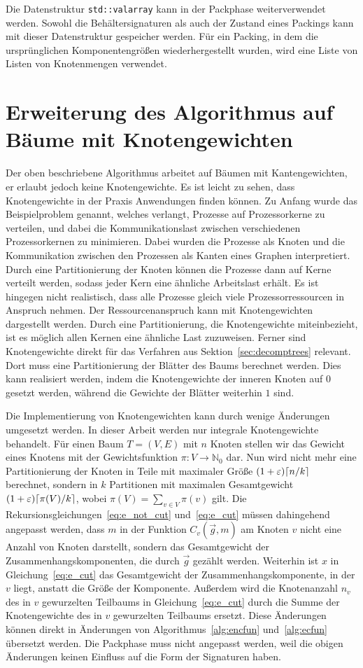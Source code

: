 Die Datenstruktur \texttt{std::valarray} kann in der Packphase weiterverwendet werden.
Sowohl die Behältersignaturen als auch der Zustand eines Packings kann mit dieser Datenstruktur gespeicher werden.
Für ein Packing, in dem die ursprünglichen Komponentengrößen wiederhergestellt wurden, wird eine Liste von Listen von Knotenmengen verwendet.

\section{Erweiterung des Algorithmus auf Bäume mit Knotengewichten}\label{sec:nodeweights}
Der oben beschriebene Algorithmus arbeitet auf Bäumen mit Kantengewichten, er erlaubt jedoch keine Knotengewichte.
Es ist leicht zu sehen, dass Knotengewichte in der Praxis Anwendungen finden können.
Zu Anfang wurde das Beispielproblem genannt, welches verlangt, Prozesse auf Prozessorkerne zu verteilen, und dabei die Kommunikationslast zwischen verschiedenen Prozessorkernen zu minimieren.
Dabei wurden die Prozesse als Knoten und die Kommunikation zwischen den Prozessen als Kanten eines Graphen interpretiert.
Durch eine Partitionierung der Knoten können die Prozesse dann auf Kerne verteilt werden, sodass jeder Kern eine ähnliche Arbeitslast erhält.
Es ist hingegen nicht realistisch, dass alle Prozesse gleich viele Prozessorressourcen in Anspruch nehmen.
Der Ressourcenanspruch kann mit Knotengewichten dargestellt werden. 
Durch eine Partitionierung, die Knotengewichte miteinbezieht, ist es möglich allen Kernen eine ähnliche Last zuzuweisen.
Ferner sind Knotengewichte direkt für das Verfahren aus Sektion~\ref{sec:decomptrees} relevant. 
Dort muss eine Partitionierung der Blätter des Baums berechnet werden.
Dies kann realisiert werden, indem die Knotengewichte der inneren Knoten auf $0$ gesetzt werden, während die Gewichte der Blätter weiterhin $1$ sind.

Die Implementierung von Knotengewichten kann durch wenige Änderungen umgesetzt werden.
In dieser Arbeit werden nur integrale Knotengewichte behandelt.
Für einen Baum $T=(V,E)$ mit $n$ Knoten stellen wir das Gewicht eines Knotens mit der Gewichtsfunktion $\pi : V \rightarrow \mathbb{N}_0$ dar.
Nun wird nicht mehr eine Partitionierung der Knoten in Teile mit maximaler Größe $(1+\varepsilon) \lceil n/k\rceil$ berechnet, sondern in $k$ Partitionen mit maximalen Gesamtgewicht $(1+\varepsilon) \lceil\pi(V)/k\rceil$, wobei $\pi(V) = \sum_{v \in V} \pi(v)$ gilt.
Die Rekursionsgleichungen~\eqref{eq:e_not_cut} und~\eqref{eq:e_cut} müssen dahingehend angepasst werden, dass $m$ in der Funktion $C_v(\vec{g}, m)$ am Knoten $v$ nicht eine Anzahl von Knoten darstellt, sondern das Gesamtgewicht der Zusammenhangskomponenten, die durch $\vec{g}$ gezählt werden.
Weiterhin ist $x$ in Gleichung~\eqref{eq:e_cut} das Gesamtgewicht der Zusammenhangskomponente, in der $v$ liegt, anstatt die Größe der Komponente.
Außerdem wird die Knotenanzahl $n_v$ des in $v$ gewurzelten Teilbaums in Gleichung~\eqref{eq:e_cut} durch die Summe der Knotengewichte des in $v$ gewurzelten Teilbaums ersetzt.
Diese Änderungen können direkt in Änderungen von Algorithmus~\ref{alg:encfun} und~\ref{alg:ecfun} übersetzt werden.
Die Packphase muss nicht angepasst werden, weil die obigen Änderungen keinen Einfluss auf die Form der Signaturen haben.

